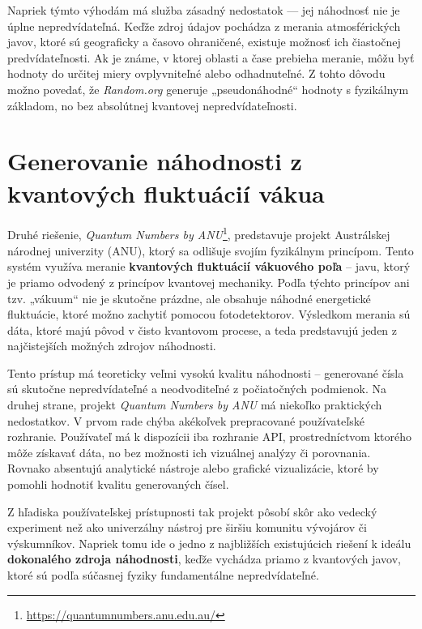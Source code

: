 Napriek týmto výhodám má služba zásadný nedostatok — jej náhodnosť nie je úplne nepredvídateľná. Keďže zdroj údajov pochádza z merania atmosférických javov, ktoré sú geograficky a časovo ohraničené, existuje možnosť ich čiastočnej predvídateľnosti. Ak je známe, v ktorej oblasti a čase prebieha meranie, môžu byť hodnoty do určitej miery ovplyvniteľné alebo odhadnuteľné. Z tohto dôvodu možno povedať, že \textit{Random.org} generuje „pseudonáhodné“ hodnoty s fyzikálnym základom, no bez absolútnej kvantovej nepredvídateľnosti.

\section{Generovanie náhodnosti z kvantových fluktuácií vákua}\label{sec:nahodne-cisla-na-baze-kvantovych-fluktuacii-vakuoveho-pola}

Druhé riešenie, \textit{Quantum Numbers by ANU}\footnote{\url{https://quantumnumbers.anu.edu.au/}}\cite{quantum_numbers_anu}, predstavuje projekt Austrálskej národnej univerzity (ANU), ktorý sa odlišuje svojím fyzikálnym princípom. Tento systém využíva meranie \textbf{kvantových fluktuácií vákuového poľa} – javu, ktorý je priamo odvodený z princípov kvantovej mechaniky. Podľa týchto princípov ani tzv. „vákuum“ nie je skutočne prázdne, ale obsahuje náhodné energetické fluktuácie, ktoré možno zachytiť pomocou fotodetektorov. Výsledkom merania sú dáta, ktoré majú pôvod v čisto kvantovom procese, a teda predstavujú jeden z najčistejších možných zdrojov náhodnosti.

Tento prístup má teoreticky veľmi vysokú kvalitu náhodnosti – generované čísla sú skutočne nepredvídateľné a neodvoditeľné z počiatočných podmienok. Na druhej strane, projekt \textit{Quantum Numbers by ANU} má niekoľko praktických nedostatkov. V prvom rade chýba akékoľvek prepracované používateľské rozhranie. Používateľ má k dispozícii iba rozhranie API, prostredníctvom ktorého môže získavať dáta, no bez možnosti ich vizuálnej analýzy či porovnania. Rovnako absentujú analytické nástroje alebo grafické vizualizácie, ktoré by pomohli hodnotiť kvalitu generovaných čísel.

Z hľadiska používateľskej prístupnosti tak projekt pôsobí skôr ako vedecký experiment než ako univerzálny nástroj pre širšiu komunitu vývojárov či výskumníkov. Napriek tomu ide o jedno z najbližších existujúcich riešení k ideálu \textbf{dokonalého zdroja náhodnosti}, keďže vychádza priamo z kvantových javov, ktoré sú podľa súčasnej fyziky fundamentálne nepredvídateľné.

